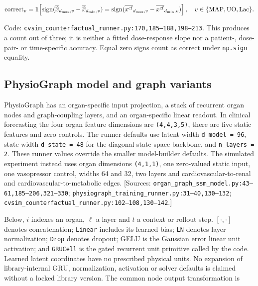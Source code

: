 \[
\mathrm{correct}_v=\mathbf1\!\left[
 \operatorname{sign}(\overline{\widehat x}_{d_{\max},v}-\overline{\widehat x}_{d_{\min},v})
 =\operatorname{sign}(\overline{x^{\rm cf}}_{d_{\max},v}-\overline{x^{\rm cf}}_{d_{\min},v})\right],
\quad v\in\{\mathrm{MAP,UO,Lac}\}.
\]


Code: \texttt{cvsim\_\allowbreak{}counterfactual\_\allowbreak{}runner.\allowbreak{}py:\allowbreak{}170,\allowbreak{}185–\allowbreak{}188,\allowbreak{}198–\allowbreak{}213}. This produces a count out of three; it is neither a fitted dose-response slope nor a patient-, dose-pair- or time-specific accuracy. Equal zero signs count as correct under \texttt{np.\allowbreak{}sign} equality.

\subsection{PhysioGraph model and graph variants}


PhysioGraph has an organ-specific input projection, a stack of recurrent organ nodes and graph-coupling layers, and an organ-specific linear readout. In clinical forecasting the four organ feature dimensions are \texttt{(4,\allowbreak{}4,\allowbreak{}3,\allowbreak{}5)}, there are five static features and zero controls. The runner defaults use latent width \texttt{d\_\allowbreak{}model =\allowbreak{} 96}, state width \texttt{d\_\allowbreak{}state =\allowbreak{} 48} for the diagonal state-space backbone, and \texttt{n\_\allowbreak{}layers =\allowbreak{} 2}. These runner values override the smaller model-builder defaults. The simulated experiment instead uses organ dimensions \texttt{(4,\allowbreak{}1,\allowbreak{}1)}, one zero-valued static input, one vasopressor control, widths 64 and 32, two layers and cardiovascular-to-renal and cardiovascular-to-metabolic edges. [Sources: \texttt{organ\_\allowbreak{}graph\_\allowbreak{}ssm\_\allowbreak{}model.\allowbreak{}py:\allowbreak{}43–\allowbreak{}61,\allowbreak{}185–\allowbreak{}206,\allowbreak{}321–\allowbreak{}330}; \texttt{physiograph\_\allowbreak{}training\_\allowbreak{}runner.\allowbreak{}py:\allowbreak{}31–\allowbreak{}40,\allowbreak{}130–\allowbreak{}132}; \texttt{cvsim\_\allowbreak{}counterfactual\_\allowbreak{}runner.\allowbreak{}py:\allowbreak{}102–\allowbreak{}108,\allowbreak{}130–\allowbreak{}142}.]

Below, \(i\) indexes an organ, \(\ell\) a layer and \(t\) a context or rollout step. \([\cdot,\cdot]\) denotes concatenation; \texttt{Linear} includes its learned bias; \texttt{LN} denotes layer normalization; \texttt{Drop} denotes dropout; GELU is the Gaussian error linear unit activation; and \texttt{GRUCell} is the gated recurrent unit primitive called by the code. Learned latent coordinates have no prescribed physical units. No expansion of library-internal GRU, normalization, activation or solver defaults is claimed without a locked library version. The common node output transformation is

